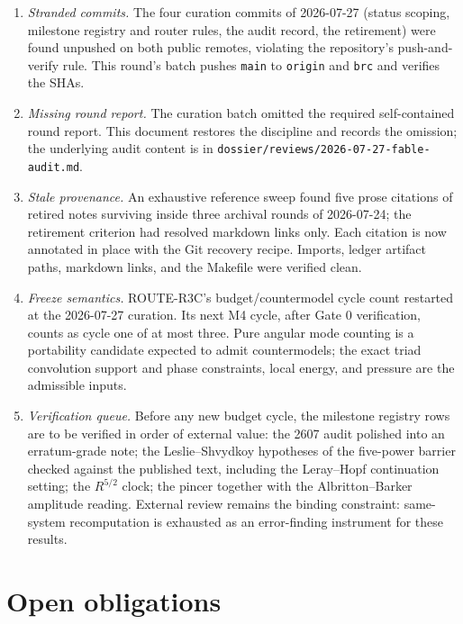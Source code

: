 \documentclass[11pt]{article}
\theoremstyle{remark}
\begin{document}
\begin{enumerate}
\item \emph{Stranded commits.}  The four curation commits of
2026-07-27 (status scoping, milestone registry and router rules, the
audit record, the retirement) were found unpushed on both public
remotes, violating the repository's push-and-verify rule.  This round's
batch pushes \texttt{main} to \texttt{origin} and \texttt{brc} and
verifies the SHAs.
\item \emph{Missing round report.}  The curation batch omitted the
required self-contained round report.  This document restores the
discipline and records the omission; the underlying audit content is in
\texttt{dossier/reviews/2026-07-27-fable-audit.md}.
\item \emph{Stale provenance.}  An exhaustive reference sweep found
five prose citations of retired notes surviving inside three archival
rounds of 2026-07-24; the retirement criterion had resolved markdown
links only.  Each citation is now annotated in place with the Git
recovery recipe.  Imports, ledger artifact paths, markdown links, and
the Makefile were verified clean.
\item \emph{Freeze semantics.}  ROUTE-R3C's budget/countermodel cycle
count restarted at the 2026-07-27 curation.  Its next M4 cycle, after
Gate 0 verification, counts as cycle one of at most three.  Pure angular
mode counting is a portability candidate expected to admit countermodels; the exact
triad convolution support and phase constraints, local energy, and
pressure are the admissible inputs.
\item \emph{Verification queue.}  Before any new budget cycle, the
milestone registry rows are to be verified in order of external value:
the 2607 audit polished into an erratum-grade note; the
Leslie--Shvydkoy hypotheses of the five-power barrier checked against
the published text, including the Leray--Hopf continuation setting; the
\(R^{5/2}\) clock; the pincer together with the Albritton--Barker
amplitude reading.  External review remains the binding constraint:
same-system recomputation is exhausted as an error-finding instrument
for these results.
\end{enumerate}

\section{Open obligations}
\end{document}
